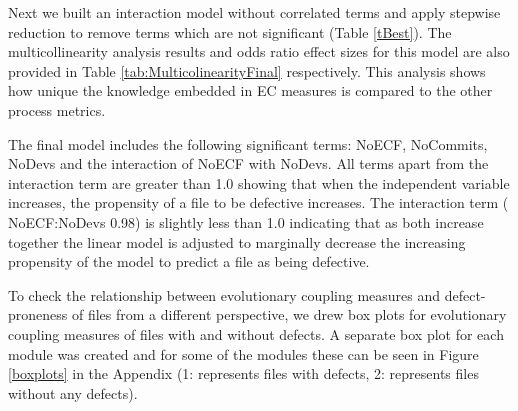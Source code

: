 \documentclass[times]{smrauth}
\begin{document}
Next we built an interaction model without correlated terms and apply stepwise reduction to remove terms which are not significant (Table \ref{tBest}). The multicollinearity analysis results and odds ratio effect sizes for this model are also provided in Table \ref{tab:MulticolinearityFinal} respectively. This analysis shows how unique the knowledge embedded in EC measures is compared to the other process metrics.

The final model includes the following significant terms: NoECF, NoCommits, NoDevs and the interaction of  NoECF with NoDevs.  All terms apart from the interaction term are greater than 1.0 showing that when the independent variable increases, the propensity of a file to be defective increases.  The interaction term ( NoECF:NoDevs 0.98) is slightly less than 1.0  indicating that as both increase together the linear model is adjusted to marginally decrease the increasing propensity of the model to predict a file as being defective.

To check the relationship between evolutionary coupling measures and defect-proneness of files from a different perspective, we drew box plots for evolutionary coupling measures of files with and without defects. A separate box plot for each module was created and for some of the modules these can be seen in Figure \ref{boxplots} in the Appendix (1: represents files with defects, 2: represents files without any defects). 




\end{document}
